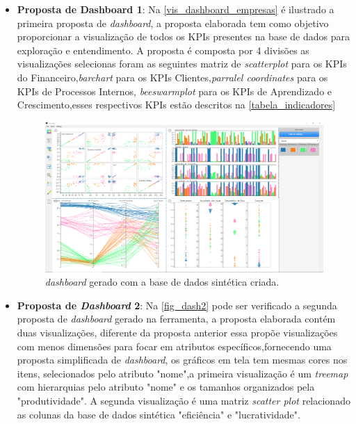 \documentclass[
	12pt,				%
	openright,			%
	oneside,			%
	a4paper,			%
	english,			%
	brazil				%
	]{abntex2}
\begin{document}
\begin{itemize}
    \item \textbf{Proposta de Dashboard 1}:
    Na \autoref{vis_dashboard_empresas} é ilustrado a primeira proposta de \textit{dashboard}, a proposta elaborada tem como objetivo proporcionar a visualização de todos os KPIs presentes na base de dados para exploração e entendimento. A proposta é composta por 4 divisões as visualizações selecionas foram as seguintes matriz de \textit{scatterplot} para os KPIs do Financeiro,\textit{barchart} para os KPIs Clientes,\textit{parralel coordinates} para os KPIs de Processos Internos, \textit{beeswarmplot} para os KPIs  de Aprendizado e Crescimento,esses respectivos KPIs estão descritos na \autoref{tabela_indicadores}
    
    \begin{figure}[!htb]
	    \caption{\label{vis_dashboard_empresas} \textit{dashboard} gerado com a base de dados sintética criada.
        }
	\begin{center}
	    \includegraphics[width=42pc,scale=1]{figures/dash1.png}
	\end{center}
    \end{figure}


    \item \textbf{Proposta de  \textit{Dashboard} 2}:
     Na \autoref{fig_dash2} pode ser verificado a segunda proposta de \textit{dashboard} gerado na ferramenta, a proposta elaborada contém duas visualizações, diferente da proposta anterior essa propõe visualizações com menos dimensões para focar em atributos específicos,fornecendo uma proposta simplificada de \textit{dashboard}, os gráficos em tela tem mesmas cores nos itens, selecionados pelo atributo "nome",a primeira visualização é um \textit{treemap} com hierarquias pelo atributo "nome" e os tamanhos organizados pela "produtividade". A segunda visualização é uma matriz \textit{scatter plot} relacionado as colunas da base de dados sintética "eficiência" e "lucratividade".
    

\end{itemize}
\end{document}
